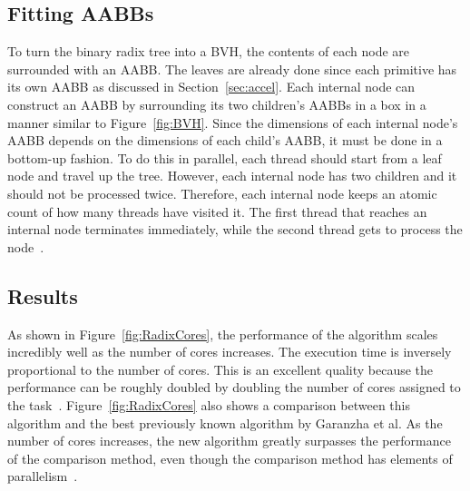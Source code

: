 \documentclass{sig-alternate}
\begin{document}
\subsection{Fitting AABBs}
\label{sec:fitting}

To turn the binary radix tree into a BVH, the contents of each node are surrounded with an AABB. The leaves are already done since each primitive has its own AABB as discussed in Section~\ref{sec:accel}. Each internal node can construct an AABB by surrounding its two children's AABBs in a box in a manner similar to Figure~\ref{fig:BVH}. Since the dimensions of each internal node's AABB depends on the dimensions of each child's AABB, it must be done in a bottom-up fashion. To do this in parallel, each thread should start from a leaf node and travel up the tree. However, each internal node has two children and it should not be processed twice. Therefore, each internal node keeps an atomic count of how many threads have visited it. The first thread that reaches an internal node terminates immediately, while the second thread gets to process the node~\cite{Karras:2012}.

%



\subsection{Results}
\label{sec:results}

As shown in Figure~\ref{fig:RadixCores}, the performance of the algorithm scales incredibly well as the number of cores increases. The execution time is inversely proportional to the number of cores. This is an excellent quality because the performance can be roughly doubled by doubling the number of cores assigned to the task~\cite{Karras:2012}. Figure~\ref{fig:RadixCores} also shows a comparison between this algorithm and the best previously known algorithm by Garanzha et al. As the number of cores increases, the new algorithm greatly surpasses the performance of the comparison method, even though the comparison method has elements of parallelism~\cite{Garanzha:2011}.
\end{document}
